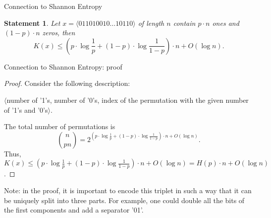 \documentclass[
aspectratio=169]{beamer}
\newtheorem{statement}{Statement}
\begin{document}
\begin{frame}{Connection to Shannon Entropy}
\begin{statement}\label{st:kologorov:entropy}
    Let $x = \langle{011010010\dotso 10110}\rangle$ of length $n$ contain $p \cdot n$ ones and $(1-p) \cdot n$ zeros, then
    \[
    K(x) \le \left(p \cdot \log \frac{1}{p} + (1-p) \cdot \log \frac{1}{1-p}\right) \cdot n + O(\log n).
    \]
    \end{statement}
\end{frame}

\begin{frame}{Connection to Shannon Entropy: proof}
    \begin{proof}
    Consider the following description:
    \begin{center}
        $\langle$number of '1's, number of '0's, index of the permutation with the given number of '1's and '0's$\rangle$.
    \end{center}
    The total number of permutations is
    \[
    \binom{n}{pn} = 2^{\left(p \cdot \log \frac{1}{p} + (1-p) \cdot \log \frac{1}{1-p}\right) \cdot n + O(\log n)}.
    \]
    Thus, $K(x) \le \left(p \cdot \log \frac{1}{p} + (1-p) \cdot \log \frac{1}{1-p}\right) \cdot n + O(\log n) = H(p) \cdot n + O(\log n)$.
    \end{proof}
    \pause
    Note: in the proof, it is important to encode this triplet in such a way that it can be uniquely split into three parts. For example, one could double all the bits of the first components and add a separator '01'.
\end{frame}
\end{document}
